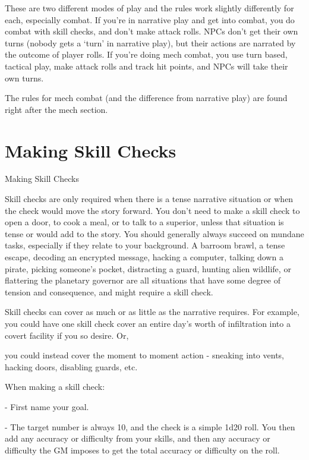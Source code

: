 These are two different modes of play and the rules work slightly differently for each, especially  
combat. If you’re in narrative play and get into combat, you do combat with skill checks, and don’t  
make attack rolls. NPCs don’t get their own turns (nobody gets a ‘turn’ in narrative play), but their  
actions are narrated by the outcome of player rolls. If you’re doing mech combat, you use turn  
based, tactical play, make attack rolls and track hit points, and NPCs will take their own turns.  

The rules for mech combat (and the difference from narrative play) are found right after the mech  
section.  

\section{Making Skill Checks}
                                          Making Skill Checks  

Skill checks are only required when there is a tense narrative situation or when the check  
would move the story forward. You don’t need to make a skill check to open a door, to cook a  
meal, or to talk to a superior, unless that situation is tense or would add to the story. You should  
generally always succeed on mundane tasks, especially if they relate to your background. A  
barroom brawl, a tense escape, decoding an encrypted message, hacking a computer, talking  
down a pirate, picking someone’s pocket, distracting a guard, hunting alien wildlife, or flattering  
the planetary governor are all situations that have some degree of tension and consequence, and  
might require a skill check.
 

Skill checks can cover as much or as little as the narrative requires. For example, you could have  
one skill check cover an entire day’s worth of infiltration into a covert facility if you so desire. Or,  

                                                                                                                  


you could instead cover the moment to moment action - sneaking into vents, hacking doors,  
disabling guards, etc.  

When making a skill check:
 
    -    First name your goal. 
 
    -    The target number is always 10, and the check is a simple 1d20 roll. You then add any  
         accuracy or difficulty from your skills, and then any accuracy or difficulty the GM imposes  
         to get the total accuracy or difficulty on the roll.
 
